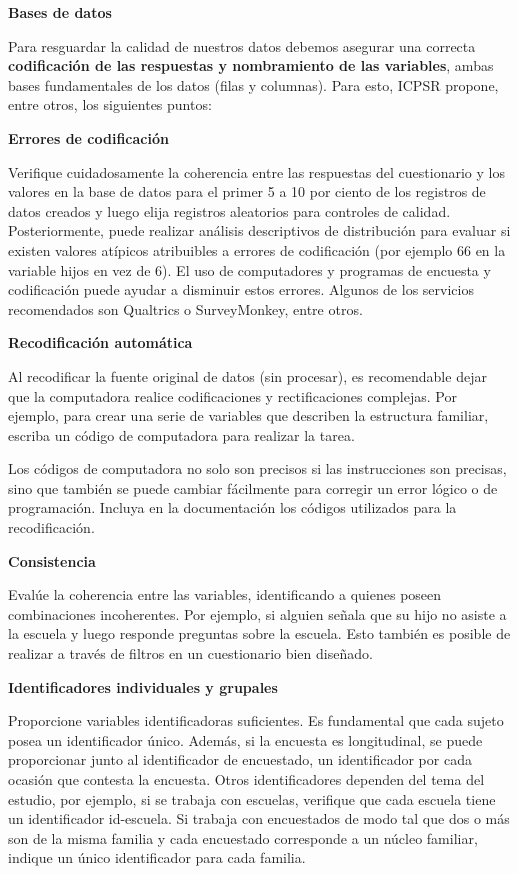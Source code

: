 \documentclass[
  spanish,
  a4paper,
  oneside]{scrbook}
\begin{document}
\textbf{Bases de datos}

Para resguardar la calidad de nuestros datos debemos asegurar una
correcta \textbf{codificación de las respuestas y nombramiento de las
variables}, ambas bases fundamentales de los datos (filas y columnas).
Para esto, ICPSR propone, entre otros, los siguientes puntos:

\textbf{Errores de codificación}

Verifique cuidadosamente la coherencia entre las respuestas del
cuestionario y los valores en la base de datos para el primer 5 a 10 por
ciento de los registros de datos creados y luego elija registros
aleatorios para controles de calidad. Posteriormente, puede realizar
análisis descriptivos de distribución para evaluar si existen valores
atípicos atribuibles a errores de codificación (por ejemplo 66 en la
variable hijos en vez de 6). El uso de computadores y programas de
encuesta y codificación puede ayudar a disminuir estos errores. Algunos
de los servicios recomendados son Qualtrics o SurveyMonkey, entre otros.

\textbf{Recodificación automática}

Al recodificar la fuente original de datos (sin procesar), es
recomendable dejar que la computadora realice codificaciones y
rectificaciones complejas. Por ejemplo, para crear una serie de
variables que describen la estructura familiar, escriba un código de
computadora para realizar la tarea.

Los códigos de computadora no solo son precisos si las instrucciones son
precisas, sino que también se puede cambiar fácilmente para corregir un
error lógico o de programación. Incluya en la documentación los códigos
utilizados para la recodificación.

\textbf{Consistencia}

Evalúe la coherencia entre las variables, identificando a quienes poseen
combinaciones incoherentes. Por ejemplo, si alguien señala que su hijo
no asiste a la escuela y luego responde preguntas sobre la escuela. Esto
también es posible de realizar a través de filtros en un cuestionario
bien diseñado.

\textbf{Identificadores individuales y grupales}

Proporcione variables identificadoras suficientes. Es fundamental que
cada sujeto posea un identificador único. Además, si la encuesta es
longitudinal, se puede proporcionar junto al identificador de
encuestado, un identificador por cada ocasión que contesta la encuesta.
Otros identificadores dependen del tema del estudio, por ejemplo, si se
trabaja con escuelas, verifique que cada escuela tiene un identificador
id-escuela. Si trabaja con encuestados de modo tal que dos o más son de
la misma familia y cada encuestado corresponde a un núcleo familiar,
indique un único identificador para cada familia.
\end{document}
